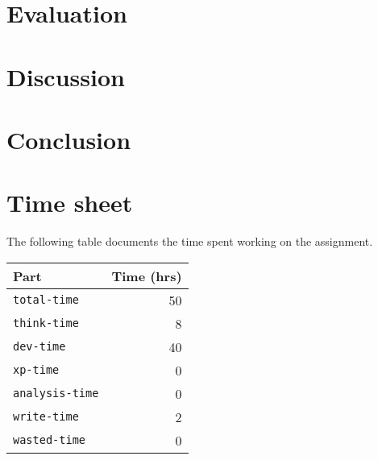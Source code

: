 \documentclass{acm_proc_article-sp}
\begin{document}
\section{Evaluation}
\label{sec_eval}

\section{Discussion}
\label{sec_discussion}

\section{Conclusion}
\label{sec_conclusion}

{}


\appendix
\section{Time sheet}

The following table documents the time spent working on the assignment.

\begin{tabular}{ | l | r | }
	\hline
	Part & Time (hrs) \\ \hline \hline
	\texttt{total-time} & 50\\ \hline
	\texttt{think-time} & 8\\ \hline
	\texttt{dev-time} & 40\\ \hline
	\texttt{xp-time} & 0\\ \hline
	\texttt{analysis-time} & 0\\ \hline
	\texttt{write-time} & 2\\ \hline
	\texttt{wasted-time} & 0\\ \hline
\end{tabular}
\end{document}

